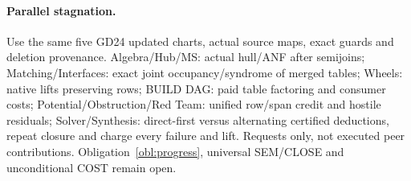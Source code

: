 \documentclass[11pt]{article}
\begin{document}
\paragraph{Parallel stagnation.}
Use the same five GD24 updated charts, actual source maps, exact guards and deletion provenance. Algebra/Hub/MS: actual hull/ANF after semijoins; Matching/Interfaces: exact joint occupancy/syndrome of merged tables; Wheels: native lifts preserving rows; BUILD DAG: paid table factoring and consumer costs; Potential/Obstruction/Red Team: unified row/span credit and hostile residuals; Solver/Synthesis: direct-first versus alternating certified deductions, repeat closure and charge every failure and lift. Requests only, not executed peer contributions. Obligation~\ref{obl:progress}, universal SEM/CLOSE and unconditional COST remain open.
\end{document}
